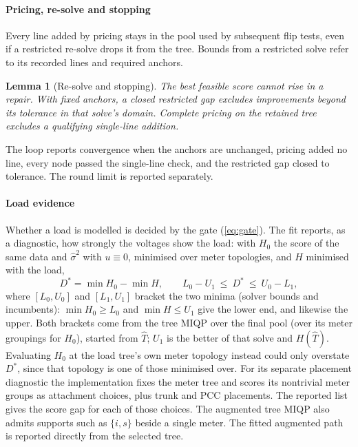 \documentclass[journal,onecolumn,11pt]{IEEEtran}
\newtheorem{lemma}{Lemma}
\begin{document}
\paragraph*{Pricing, re-solve and stopping} Every line added by pricing stays in the pool used by subsequent
flip tests, even if a restricted re-solve drops it from the tree. Bounds from a restricted solve refer to its
recorded lines and required anchors.
\begin{lemma}[Re-solve and stopping]\label{lem:stop}
The best feasible score cannot rise in a repair. With fixed anchors, a closed restricted gap excludes improvements
beyond its tolerance in that solve's domain. Complete pricing on the retained tree excludes a qualifying single-line addition.
\end{lemma}
The loop reports convergence when the anchors are unchanged, pricing added no line, every node passed the single-line
check, and the restricted gap closed to tolerance. The round limit is reported separately.

\paragraph*{Load evidence} Whether a load is modelled is decided by the gate (\ref{eq:gate}). The fit reports, as a
diagnostic, how strongly the voltages show the load: with $H_0$ the score of the same data and $\hat\sigma^2$ with
$u\equiv0$, minimised over meter topologies, and $H$ minimised with the load,
\begin{equation}\label{eq:evidence}
D^*=\min H_0-\min H,\qquad L_0-U_1\ \le\ D^*\ \le\ U_0-L_1,
\end{equation}
where $[L_0,U_0]$ and $[L_1,U_1]$ bracket the two minima (solver bounds and incumbents): $\min H_0\ge L_0$ and $\min H\le U_1$
give the lower end, and likewise the upper. Both brackets come from the tree MIQP over the final pool (over its meter
groupings for $H_0$), started from $\hat T$; $U_1$ is the better of that solve and $H(\hat T)$. Evaluating $H_0$ at the load tree's own meter topology instead could only
overstate $D^*$, since that topology is one of those minimised over. For its separate placement diagnostic the implementation fixes the meter tree and scores its
nontrivial meter groups as attachment choices, plus trunk and PCC placements. The reported list gives the score
gap for each of those choices. The augmented tree MIQP also admits supports such as $\{i,s\}$ beside a single
meter. The fitted augmented path is reported directly from the selected tree.
\end{document}
